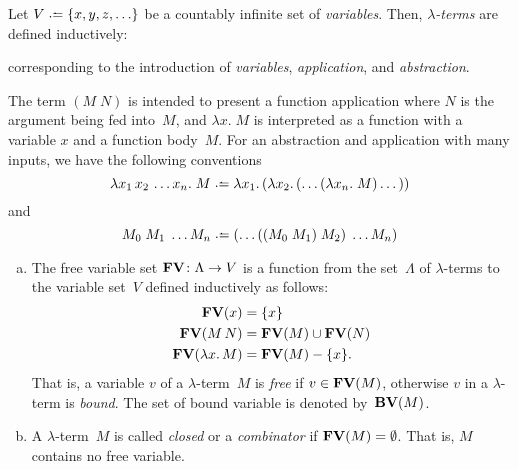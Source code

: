 \begin{definition}[Syntax]
  Let $V \defeq \{ x, y, z, \ldots \}$ be a countably infinite set of
  \emph{variables}.  Then, \emph{$\lambda$-terms} are defined inductively:
  \begin{multicols}{3}
    \begin{prooftree}
    \end{prooftree}
    \columnbreak
    \begin{prooftree}
    \end{prooftree}
    \columnbreak
    \begin{prooftree}
    \end{prooftree}
  \end{multicols}
  \noindent corresponding to the introduction of \emph{variables},
  \emph{application}, and \emph{abstraction}.
\end{definition}
The term $(M\;N)$ is intended to present a function application where $N$ is the
argument being fed into~$M$, and $\lambda x.\; M$ is interpreted as a function
with a variable $x$ and a function body~$M$. For an abstraction and
application with many inputs, we have the following conventions
\[
  \lambda x_1\,x_2\,\dots x_n.\; M
  \defeq \lambda x_1.\,(\lambda x_2.\, (\dots (\lambda x_n.\; M)\dots))
\]
and
\[
  M_0\;M_1\;\dots M_n \defeq (\dots ((M_0\;M_1)\;M_2)\;\dots M_n)
\]
\begin{definition}
  \begin{enumerate}[(a)]
    \item The free variable set $\FV\colon \Lambda \to V$ is a function from the
      set~$\Lambda$ of $\lambda$-terms to the variable set~$V$ defined
      inductively as follows:
      \begin{align*}
        \FV(x) & = \{ x \} \\
        \FV(M\, N) & = \FV(M) \cup \FV(N) \\
        \FV(\lambda x.\, M) & = \FV(M) - \{ x \}.
      \end{align*}
      That is, a variable $v$ of a $\lambda$-term~$M$ is \emph{free} if $v \in
      \FV(M)$, otherwise $v$ in a $\lambda$-term is
      \emph{bound}. The set of bound variable is denoted by~$\BV(M)$.
    \item A $\lambda$-term~$M$ is called \emph{closed} or a \emph{combinator} if
      $\FV(M) = \emptyset$. That
      is, $M$ contains no free variable.
  \end{enumerate}
\end{definition}

